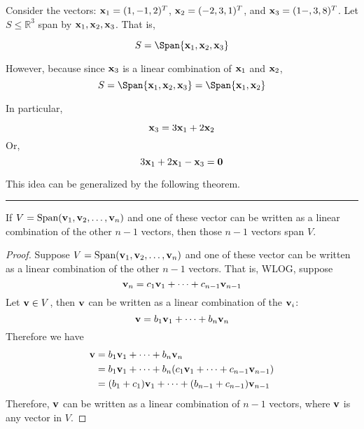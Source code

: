 \begin{example}
	Consider the vectors: ${\bf x}_1 = (1, -1, 2)^T$, ${\bf x}_2 = (-2, 3, 1)^T$, and ${\bf x}_3 = (1-, 3, 8)^T$.  Let $S \le \mathbb{R}^3$ span by ${\bf x}_1, {\bf x}_2, {\bf x}_3$.  That is, 
	
	\[  S = \Span\{{\bf x}_1, {\bf x}_2, {\bf x}_3\} \]
	
	However, because since ${\bf x}_3$ is a linear combination of ${\bf x}_1$ and ${\bf x}_2$, 
		\[  S = \Span\{{\bf x}_1, {\bf x}_2, {\bf x}_3\}   =\Span\{{\bf x}_1, {\bf x}_2 \}  \]
		
		In particular, 
		
		\[   {\bf x}_3 = 3  {\bf x}_1   + 2  {\bf x}_2     \]
		Or, 
		\[     3  {\bf x}_1   + 2  {\bf x}_1  - {\bf x}_3  = {\bf 0}   \]

\end{example}

This idea can be generalized by the following theorem.



\rule[0.01in]{\textwidth}{0.0025in}


 


\begin{theorem}
	If  $V = \text{Span}({\bf v}_1, {\bf v}_2, \dots, {\bf v}_n)$ and one of these vector can be written as a linear combination of the other $n-1$ vectors, then those $n-1$ vectors span $V$.
	
	\begin{proof}
		Suppose $V = \text{Span}({\bf v}_1, {\bf v}_2, \dots, {\bf v}_n)$ and one of these vector can be written as a linear combination of the other $n-1$ vectors.  That is, WLOG, suppose
		\[ {\bf v}_n = c_1 {\bf v}_1 + \cdots + c_{n-1}{\bf v}_{n-1} \]
		Let ${\bf v} \in V$, then ${\bf v}$ can be written as a linear combination of the ${\bf v}_i$:
		\[ {\bf v} = b_1 {\bf v}_1 + \cdots + b_n {\bf v}_n \]
		Therefore we have 
		\begin{align*}
			 {\bf v} &= b_1 {\bf v}_1 + \cdots + b_n {\bf v}_n\\
			 	&= b_1 {\bf v}_1 + \cdots + b_n ( c_1 {\bf v}_1 + \cdots + c_{n-1}{\bf v}_{n-1})\\
				&= (b_1+c_1){\bf v}_1 + \cdots +  (b_{n-1}+c_{n-1}){\bf v}_{n-1} 
		\end{align*}
		Therefore, ${\bf v}$ can be written as a linear combination of $n-1$ vectors, where ${\bf v}$ is any vector in $V$.
	\end{proof}
\end{theorem}
 
